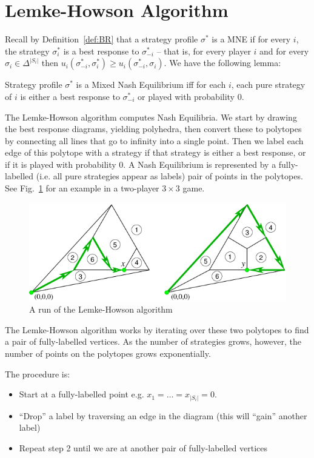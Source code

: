 \section{Lemke-Howson Algorithm}

Recall by Definition~\ref{def:BR} that a strategy profile $\sigma^*$ is a MNE
if for every $i$, the strategy $\sigma^*_i$ is a best response to
$\sigma^*_{-i}$ -- that is, for every player $i$ and for every $\sigma_i \in
\Delta^{|S_i|}$ then $u_i(\sigma^*_{-i}, \sigma^*_i) \ge u_i(\sigma^*_{-i},
\sigma_i)$. We have the following lemma:

\begin{lemma}
	Strategy profile $\sigma^*$ is a Mixed Nash Equilibrium iff for each $i$,
	each pure strategy of $i$ is either a best response to $\sigma^*_{-i}$ or
	played with probability 0.
\end{lemma}

The Lemke-Howson algorithm computes Nash Equilibria. We start by drawing the
best response diagrams, yielding polyhedra, then convert these to polytopes by
connecting all lines that go to infinity into a single point.  Then we label
each edge of this polytope with a strategy if that strategy is either a best
response, or if it is played with probability 0. A Nash Equilibrium is
represented by a fully-labelled (i.e. all pure strategies appear as labels)
pair of points in the polytopes. See Fig.~\ref{fig:polytopes} for an example in
a two-player $3\times3$ game.

\begin{figure}[h]
	\centering
	\includegraphics[width=.8\textwidth]{polytopes.png}
	\caption{A run of the Lemke-Howson algorithm}
	\label{fig:polytopes}
\end{figure}

The Lemke-Howson algorithm works by iterating over these two polytopes to find
a pair of fully-labelled vertices. As the number of strategies grows, however,
the number of points on the polytopes grows exponentially.

The procedure is:

\begin{itemize}
	\item Start at a fully-labelled point e.g. $x_1 = \ldots = x_{|S_i|} = 0$.
	\item ``Drop'' a label by traversing an edge in the diagram (this will
		``gain'' another label)
	\item Repeat step 2 until we are at another pair of fully-labelled vertices
\end{itemize}

